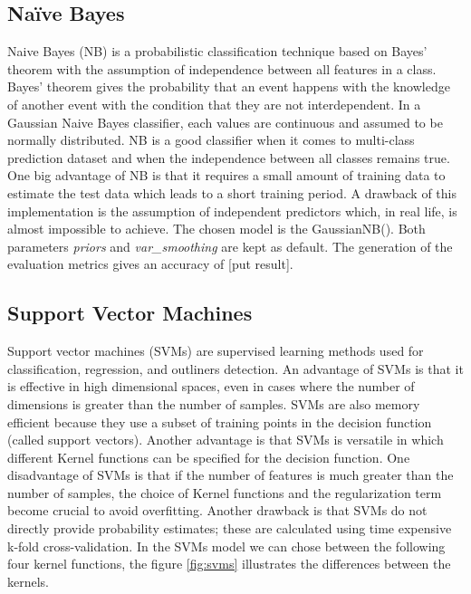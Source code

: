 \documentclass[11pt]{article}
\begin{document}
	\subsection{Naïve Bayes}
	Naive Bayes (NB) is a probabilistic classification technique based on Bayes’ theorem with the assumption of independence between all features in a class. Bayes’ theorem gives the probability that an event happens with the knowledge of another event with the condition that they are not interdependent. In a Gaussian Naive Bayes classifier, each values are continuous and assumed to be normally distributed.
	\medbreak
	NB is a good classifier when it comes to multi-class prediction dataset and when the independence between all classes remains true. One big advantage of NB is that it requires a small amount of training data to estimate the test data which leads to a short training period. A drawback of this implementation is the assumption of independent predictors which, in real life, is almost impossible to achieve. 
	\medbreak
	The chosen model is the GaussianNB(). Both parameters \textit{priors} and \textit{var\_smoothing} are kept as default. The generation of the evaluation metrics gives an accuracy of [put result].

	
	\subsection{Support Vector Machines}
	Support vector machines (SVMs) are supervised learning methods used for classification, regression, and outliners detection.
	\medbreak
	An advantage of SVMs is that it is effective in high dimensional spaces, even in cases where the number of dimensions is greater than the number of samples. SVMs are also memory efficient because they use a subset of training points in the decision function (called support vectors). Another advantage is that SVMs is versatile in which different Kernel functions can be specified for the decision function.
	One disadvantage of SVMs is that if the number of features is much greater than the number of samples, the choice of Kernel functions and the regularization term become crucial to avoid overfitting. Another drawback is that SVMs do not directly provide probability estimates; these are calculated using time expensive k-fold cross-validation.
	\medbreak
	In the SVMs model we can chose between the following four kernel functions, the figure \ref{fig:svms} illustrates the differences between the kernels.
	
\end{document}
